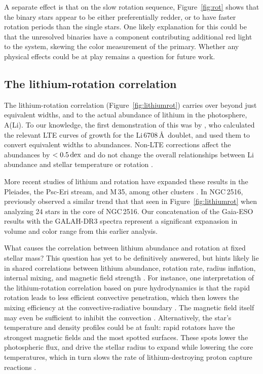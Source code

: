 \documentclass[12pt,twocolumn,tighten]{aastex63}
\newcommand{\cn}{NGC\,2516} %
\begin{document}
A separate effect is that on the slow rotation sequence,
Figure~\ref{fig:rot} shows that the binary stars appear to be either
preferentially redder, or to have faster rotation periods than the
single stars.  One likely explanation for this could be that the
unresolved binaries have a component contributing additional red light
to the system, skewing the color measurement of the primary.  Whether
any physical effects could be at play remains a question for future
work.


\subsection{The lithium-rotation correlation}
\label{discussion:lithium}

The lithium-rotation correlation (Figure~\ref{fig:lithiumrot}) carries
over beyond just equivalent widths, and to the actual abundance of
lithium in the photosphere, A(Li).  To our knowledge, the first
demonstration of this was by \citet{soderblom_evolution_1993}, who
calculated the relevant LTE curves of growth for the Li\,6708\,\AA\
doublet, and used them to convert equivalent widths to abundances.
Non-LTE corrections affect the abundances by $<0.5\,{\rm dex}$ and do
not change the overall relationships between Li abundance and stellar
temperature or rotation \citep{carlsson_1994,lind_departures_2009}.

More recent studies of lithium and rotation have expanded these
results in the Pleiades, the Psc-Eri stream, and M\,35, among other
clusters
\citep{bouvier_pleiades_lirot_2018,arancibia_2020,jeffries_m35_li_2020,hawkins_2020}.
In \cn, \citet{jeffries_rotation_1998} previously observed a similar
trend that that seen in Figure~\ref{fig:lithiumrot} when analyzing 24
stars in the core of \cn.  Our concatenation of the
\citet{randich_gaiaeso_2018} Gaia-ESO results with the GALAH-DR3
spectra represent a significant expanasion in volume and color range
from this earlier analysis.

What causes the correlation between lithium abundance and rotation at
fixed stellar mass?  This question has yet to be definitively
answered, but hints likely lie in shared correlations between lithium
abundance, rotation rate, radius inflation, internal mixing, and
magnetic field strength
\citep{chabrier_evolution_2007,somers_measurement_2017,jeffries_m35_li_2020}.
For instance, one interpretation of the lithium-rotation correlation
based on pure hydrodynamics is that the rapid rotation leads to less
efficient convective penetration, which then lowers the mixing
efficiency at the convective-radiative boundary
\citep{baraffe_lithium_2017}.  The magnetic field itself may even be
sufficient to inhibit the convection \citep{ventura_Li_B_1998}.
Alternatively, the star's temperature and density profiles could be at fault: rapid rotators
have the strongest magnetic fields and the most spotted surfaces.
These spots lower the photospheric flux, and drive the stellar radius
to expand while lowering the core temperatures, which in turn slows
the rate of lithium-destroying proton capture reactions
\citep{feiden_magnetic_2013,somers_rotation_2015}.  
\end{document}
